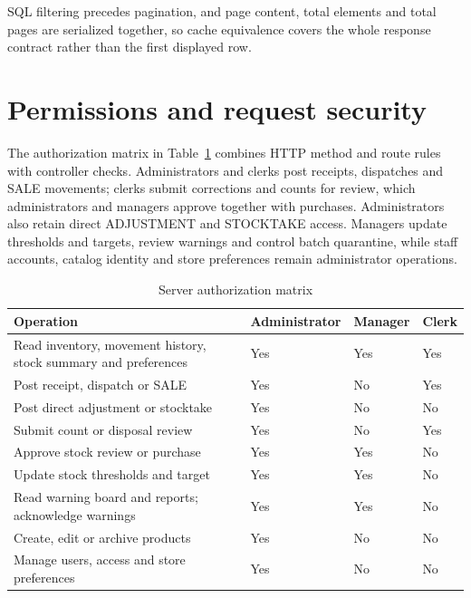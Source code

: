 SQL filtering precedes pagination, and page content, total elements and total pages are serialized together, so cache equivalence covers the whole response contract rather than the first displayed row.


\FloatBarrier

\section{Permissions and request security}

The authorization matrix in Table~\ref{tab:role-matrix} combines HTTP method and route rules with controller checks. Administrators and clerks post receipts, dispatches and SALE movements; clerks submit corrections and counts for review, which administrators and managers approve together with purchases. Administrators also retain direct ADJUSTMENT and STOCKTAKE access. Managers update thresholds and targets, review warnings and control batch quarantine, while staff accounts, catalog identity and store preferences remain administrator operations.


\begin{table}[htbp]\centering\small{}\setlength{\tabcolsep}{3pt}\renewcommand{\arraystretch}{1.25}
\caption{Server authorization matrix}\label{tab:role-matrix}
\begin{tabular}{>{\raggedright\arraybackslash}p{}>{\raggedright\arraybackslash}p{}>{\raggedright\arraybackslash}p{}>{\raggedright\arraybackslash}p{}}
\toprule
\textbf{Operation} & \textbf{Administrator} & \textbf{Manager} & \textbf{Clerk} \\
\midrule
\leavevmode{}Read inventory, movement history, stock summary and preferences & \leavevmode{}Yes & \leavevmode{}Yes & \leavevmode{}Yes \\
\leavevmode{}Post receipt, dispatch or SALE & \leavevmode{}Yes & \leavevmode{}No & \leavevmode{}Yes \\
\leavevmode{}Post direct adjustment or stocktake & \leavevmode{}Yes & \leavevmode{}No & \leavevmode{}No \\
\leavevmode{}Submit count or disposal review & \leavevmode{}Yes & \leavevmode{}No & \leavevmode{}Yes \\
\leavevmode{}Approve stock review or purchase & \leavevmode{}Yes & \leavevmode{}Yes & \leavevmode{}No \\
\leavevmode{}Update stock thresholds and target & \leavevmode{}Yes & \leavevmode{}Yes & \leavevmode{}No \\
\leavevmode{}Read warning board and reports; acknowledge warnings & \leavevmode{}Yes & \leavevmode{}Yes & \leavevmode{}No \\
\leavevmode{}Create, edit or archive products & \leavevmode{}Yes & \leavevmode{}No & \leavevmode{}No \\
\leavevmode{}Manage users, access and store preferences & \leavevmode{}Yes & \leavevmode{}No & \leavevmode{}No \\
\bottomrule\end{tabular}\end{table}

